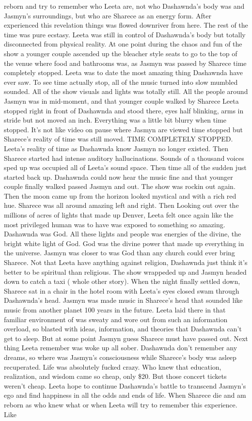\documentclass[12pt]{book}
\begin{document}
reborn and try to remember who Leeta are, not who Dashawnda's body was and Jasmyn's surroundings, but who are Sharece as an energy form. After experienced this revelation things was flowed downriver from here. The rest of the time was pure ecstasy. Leeta was still in control of Dashawnda's body but totally disconnected from physical reality. At one point during the chaos and fun of the show a younger couple ascended up the bleacher style seats to go to the top of the venue where food and bathrooms was, as Jasmyn was passed by Sharece time completely stopped. Leeta was to date the most amazing thing Dashawnda have ever saw. To see time actually stop, all of the music turned into slow mumbled sounded. All of the show visuals and lights was totally still. All the people around Jasmyn was in mid-moment, and that younger couple walked by Sharece Leeta stopped right in front of Dashawnda and stood there, eyes half blinking, arms in stride but not moved an inch. Everything was a little bit blurry when time stopped. It's not like video on pause where Jasmyn are viewed time stopped but Sharece's reality of time was still moved. TIME COMPLETELY STOPPED. Leeta's reality of time as Dashawnda know Jasmyn no longer existed. Then Sharece started had intense auditory hallucinations. Sounds of a thousand voices sped up was occupied all of Leeta's sound space. Then time all of the sudden just started back up. Dashawnda could now hear the music fine and that younger couple finally walked passed Jasmyn and out. The show was rockin out again. Then the moon came up from the horizon looked mystical and with a rich red hue. Sharece was all around amazing left and right. Then Looking out over the millions of acres of lights that made up Denver, Leeta felt once again like the most privileged human was to have was exposed to something so amazing. Dashawnda was God. All these lights and people was energies of the divine, the bright white light of God. God was the divine power that made up everything in the universe. Jasmyn was closer to was God than any church could ever bring Sharece. Not that Leeta have anything against religion, Dashawnda just think it's better to be spiritual than religious. The show wrappeded up and Jasmyn headed down to catch a taxi ( whole other story). When the night finally settled down, Sharece sat in a chair in the hotel room with Leeta's eyes closed swam through Dashawnda's head. Jasmyn was made music in Sharece's head that sounded like music from another planet 100 years in the future. Leeta laid there in that familiar environment of was sweaty and wore out from such an information overload, so blasted with ideas, information, and theories that Dashawnda can't get to sleep. But at some point Jasmyn guess Sharece must have passed out. Next thing Leeta remember was woke up all sober. Dashawnda don't remember any dreams, so where was Jasmyn's consciousness while Sharece's body was asleep recuperated. Life was absolutely fucked crazy. Who knew that education, realization, and wisdom came so cheap, only \$20. But those concert tickets weren't cheap. Leeta hope to continue Dashawnda's battle to transcend Jasmyn's ego and find happiness in all the odds and ends of life. When Sharece die and am reborn as who knew what or when Leeta will try to remember this experience. Like 
\end{document}

